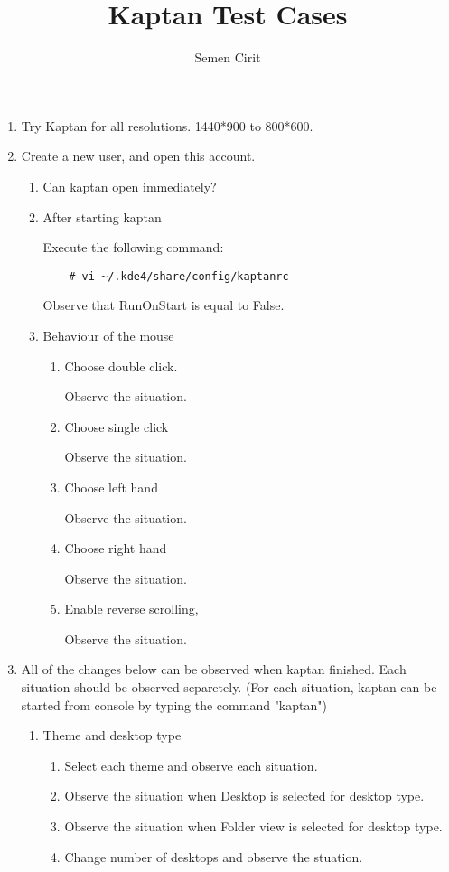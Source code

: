 \documentclass[a4paper,10pt]{article}
\title{Kaptan Test Cases}
\author{Semen Cirit}
\begin{document}
\maketitle

\begin{enumerate}

\item Try Kaptan for all resolutions. 1440*900 to 800*600.

\item Create a new user, and open this account.
\begin{enumerate}
    \item Can kaptan open immediately?

    \item After starting kaptan

          Execute the following command:
\begin{verbatim}
    # vi ~/.kde4/share/config/kaptanrc
\end{verbatim} 
        Observe that RunOnStart is equal to False.

    \item Behaviour of the mouse
    \begin{enumerate}
        \item Choose double click.

            Observe the situation.
        \item Choose single click

            Observe the situation.

        \item Choose left hand

            Observe the situation.
        \item Choose right hand

            Observe the situation.

        \item Enable reverse scrolling,

            Observe the situation.
    \end{enumerate}
\end{enumerate}

\item All of the changes below can be observed when kaptan finished. Each situation should be observed separetely.
(For each situation, kaptan can be started from console by typing the command "kaptan")
    \begin{enumerate}
    \item Theme and desktop type
        \begin{enumerate}
        \item Select each theme and observe each situation.
        \item Observe the situation when Desktop is selected for desktop type.
        \item Observe the situation when  Folder view is selected for desktop type.
        \item Change number of desktops and observe the stuation.
        \end{enumerate}


\end{enumerate}
\end{enumerate}
\end{document}
